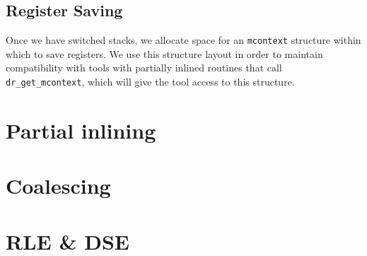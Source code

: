 \subsection{Register Saving}

Once we have switched stacks, we allocate space for an {\tt mcontext} structure
within which to save registers.  We use this structure layout in order to
maintain compatibility with tools with partially inlined routines that call
{\tt dr\_get\_mcontext}, which will give the tool access to this structure.

\section{Partial inlining}

\section{Coalescing}

\section{RLE \& DSE}

